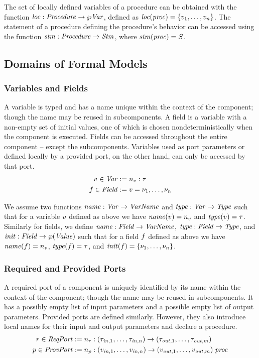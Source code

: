 \documentclass[a4paper,10pt,english]{article}
\begin{document}
The set of locally defined variables of a procedure can be obtained
with the function $\mathit{loc} : \mathit{Procedure} \rightarrow
\wp \mathit{Var}$, defined as $\mathit{loc}(\mathit{proc}) = \{v_1, \ldots, v_n\}$. The statement of a
procedure defining the procedure's behavior can be accessed using the function $\mathit{stm} : \mathit{Procedure} \rightarrow \mathit{Stm}$, where
$\mathit{stm}(\mathit{proc}) = S$.

\subsection{Domains of Formal Models}

\subsubsection{Variables and Fields}
A variable is typed and has a name unique within the context of the component; though the name may be reused in subcomponents.
A field is a variable with a non-empty set of initial values, one of which is chosen nondeterministically when
the component is executed. Fields can be accessed throughout the entire component -- except the subcomponents. Variables used as
port parameters or defined locally by a provided port, on the other hand, can only be accessed by that port. 
\begin{align*}
	v \in \mathit{Var} &:= n_v \; \mathtt{:} \; \tau \\
	f \in \mathit{Field} &:= v \; \mathtt{=} \; \nu_1, \ldots, \nu_n
\end{align*}

We assume two functions $\mathit{name} : \mathit{Var} \rightarrow \mathit{VarName}$ and $\mathit{type} : \mathit{Var} \rightarrow \mathit{Type}$ such that for a variable
$v$ defined as above we have $\mathit{name}(v) = n_v$ and $\mathit{type}(v) = \tau$. Similarly for
fields, we define $\mathit{name} : \mathit{Field} \rightarrow \mathit{VarName}$, $\mathit{type} : \mathit{Field} \rightarrow \mathit{Type}$, and $\mathit{init} : \mathit{Field} \rightarrow
\wp (\mathit{Value})$ such that for a field $f$ defined as above we have $\mathit{name}(f) =
n_v$, $\mathit{type}(f) = \tau$, and $\mathit{init}(f) = \{\nu_1, \ldots, \nu_n\}$.

\subsubsection{Required and Provided Ports}
A required port of a component is uniquely identified by its name within the context of the component; though the name may be
reused in subcomponents. It has a possibly empty list of input parameters and a possible empty list of output parameters. 
Provided ports are defined similarly. However, they also introduce local names for their input and output parameters and declare a
procedure. 
\begin{align*}
	r \in \mathit{ReqPort} &:= n_r \; \mathtt{:} \; \mathtt{(} \tau_{\mathit{in}, 1}, \ldots, \tau_{\mathit{in}, n} \mathtt{) \rightarrow (} \tau_{\mathit{out},1}, \ldots, \tau_{\mathit{out}, m} \mathtt{)} 
	\\
	p \in \mathit{ProvPort} &:= n_p \; \mathtt{:} \; \mathtt{(} v_{\mathit{in}, 1}, \ldots, v_{\mathit{in}, n} \mathtt{) \rightarrow (} v_{\mathit{out}, 1}, \ldots, v_{\mathit{out}, m} \mathtt{)} \; \mathit{proc}
\end{align*}
\end{document}
